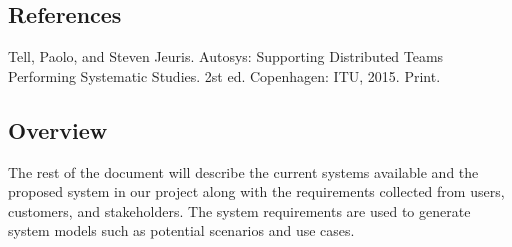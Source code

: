 \subsection{References}
Tell, Paolo, and Steven Jeuris. Autosys: Supporting Distributed Teams Performing Systematic Studies. 2st ed. Copenhagen: ITU, 2015. Print.

\subsection{Overview}
The rest of the document will describe the current systems available and the proposed system in our project along with the requirements collected from users, customers, and stakeholders. The system requirements are used to generate system models such as potential scenarios and use cases. 

